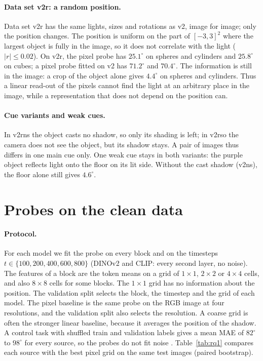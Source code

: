 \documentclass[10pt]{article}
\newcommand{\degr}{^\circ}
\begin{document}
\paragraph{Data set v2r: a random position.}
Data set v2r has the same lights, sizes and rotations as v2, image for image; only the position changes.
The position is uniform on the part of $[-3,3]^2$ where the largest object is fully in the image, so it does not correlate with the light ($|r|\le0.02$).
On v2r, the pixel probe has $25.1\degr$ on spheres and cylinders and $25.8\degr$ on cubes; a pixel probe fitted on v2 has $71.2\degr$ and $70.4\degr$.
The information is still in the image: a crop of the object alone gives $4.4\degr$ on spheres and cylinders.
Thus a linear read-out of the pixels cannot find the light at an arbitrary place in the image, while a representation that does not depend on the position can.

\paragraph{Cue variants and weak cues.}
In v2rns the object casts no shadow, so only its shading is left; in v2rso the camera does not see the object, but its shadow stays.
A pair of images thus differs in one main cue only.
One weak cue stays in both variants: the purple object reflects light onto the floor on its lit side. Without the cast shadow (v2ns), the floor alone still gives $4.6\degr$.

\section{Probes on the clean data}
\label{sec:rq1}

\paragraph{Protocol.}
For each model we fit the probe on every block and on the timesteps $t\in\{100,200,400,600,800\}$ (DINOv2 and CLIP: every second layer, no noise).
The features of a block are the token means on a grid of $1\times1$, $2\times2$ or $4\times4$ cells, and also $8\times8$ cells for some blocks. The $1\times1$ grid has no information about the position.
The validation split selects the block, the timestep and the grid of each model.
The pixel baseline is the same probe on the RGB image at four resolutions, and the validation split also selects the resolution.
A coarse grid is often the stronger linear baseline, because it averages the position of the shadow.
A control task with shuffled train and validation labels gives a mean MAE of $82\degr$ to $98\degr$ for every source, so the probes do not fit noise \citep{hewitt2019control}.
Table~\ref{tab:rq1} compares each source with the best pixel grid on the same test images (paired bootstrap).
\end{document}
